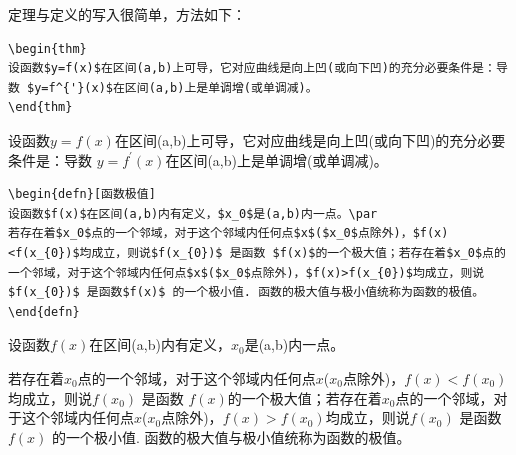 定理与定义的写入很简单，方法如下：
\begin{lstlisting}[caption={定理写入代码}]
\begin{thm}
设函数$y=f(x)$在区间(a,b)上可导，它对应曲线是向上凹(或向下凹)的充分必要条件是：导数 $y=f^{'}(x)$在区间(a,b)上是单调增(或单调减)。
\end{thm}
\end{lstlisting}
\begin{thm}
	设函数$y=f(x)$在区间(a,b)上可导，它对应曲线是向上凹(或向下凹)的充分必要条件是：导数 $y=f^{'}(x)$在区间(a,b)上是单调增(或单调减)。
\end{thm}
\begin{lstlisting}[caption={定义写入代码}]
\begin{defn}[函数极值]
设函数$f(x)$在区间(a,b)内有定义，$x_0$是(a,b)内一点。\par
若存在着$x_0$点的一个邻域，对于这个邻域内任何点$x$($x_0$点除外)，$f(x)<f(x_{0})$均成立，则说$f(x_{0})$ 是函数 $f(x)$的一个极大值；若存在着$x_0$点的一个邻域，对于这个邻域内任何点$x$($x_0$点除外)，$f(x)>f(x_{0})$均成立，则说$f(x_{0})$ 是函数$f(x)$ 的一个极小值. 函数的极大值与极小值统称为函数的极值。
\end{defn}
\end{lstlisting}
\begin{defn}[函数极值]
	设函数$f(x)$在区间(a,b)内有定义，$x_0$是(a,b)内一点。\par
	若存在着$x_0$点的一个邻域，对于这个邻域内任何点$x$($x_0$点除外)，$f(x)<f(x_{0})$均成立，则说$f(x_{0})$ 是函数 $f(x)$的一个极大值；若存在着$x_0$点的一个邻域，对于这个邻域内任何点$x$($x_0$点除外)，$f(x)>f(x_{0})$均成立，则说$f(x_{0})$ 是函数$f(x)$ 的一个极小值. 函数的极大值与极小值统称为函数的极值。
\end{defn}

